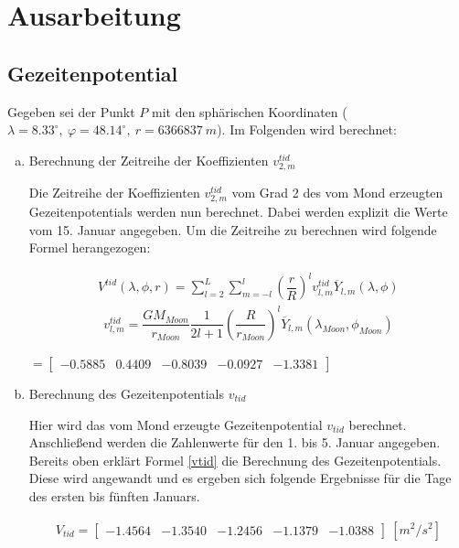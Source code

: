 \chapter*{Ausarbeitung}

\section{Gezeitenpotential}

Gegeben sei der Punkt $P$ mit den sphärischen Koordinaten ($\lambda = 8.33^{\circ},~ \varphi = 48.14^{\circ},~r = 6366837~m$). Im Folgenden wird berechnet: 

\begin{enumerate}[a)]
\item Berechnung der Zeitreihe der Koeffizienten $v_{2,m}^{tid}$ 

Die Zeitreihe der Koeffizienten $v_{2,m}^{tid}$ vom Grad 2 des vom Mond erzeugten Gezeitenpotentials werden nun berechnet. Dabei werden explizit die Werte vom 15. Januar angegeben. Um die Zeitreihe zu berechnen wird folgende Formel herangezogen: 

\begin{gather}
V^{tid}(\lambda, \phi, r) = \sum_{l=2}^{L} \sum_{m=-l}^{l} \left(\dfrac{r}{R}\right)^l v_{l,m}^{tid} \overline{Y}_{l,m}(\lambda,\phi) 
\label{vtid}
\end{gather} 
\begin{gather}
v_{l,m}^{tid} = \dfrac{GM_{Moon}}{r_{Moon}} \dfrac{1}{2l+1} \left(\dfrac{R}{r_{Moon}}\right)^l \overline{Y}_{l,m} (\lambda_{Moon},\phi_{Moon})
\end{gather}
\begin{center}
$= \begin{bmatrix}
-0.5885 &  0.4409 &  -0.8039  & -0.0927 & -1.3381
\end{bmatrix}$
\end{center}

\item Berechnung des Gezeitenpotentials $v_{tid}$ 

Hier wird das vom Mond erzeugte Gezeitenpotential $v_{tid}$ berechnet. Anschließend werden die Zahlenwerte für den 1. bis 5. Januar angegeben. Bereits oben erklärt Formel \ref{vtid} die Berechnung des Gezeitenpotentials. Diese wird angewandt und es ergeben sich folgende Ergebnisse für die Tage des ersten bis fünften Januars. 

\begin{gather*}
V_{tid} = \begin{bmatrix}
-1.4564&-1.3540&-1.2456&-1.1379&-1.0388
\end{bmatrix}~[m^2/s^2]
\end{gather*}


\end{enumerate}
